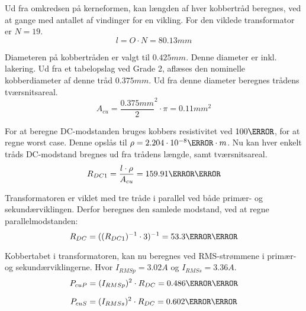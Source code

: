 Ud fra omkredsen på kerneformen, kan længden af hver kobbertråd beregnes, ved at gange med antallet af vindinger for en vikling. For den viklede transformator er $N=19$.
\begin{equation} \label{Lengde}
l = O \cdot N = 80.13mm
\end{equation}

Diameteren på kobbertråden er valgt til $0.425mm$. Denne diameter er inkl. lakering. Ud fra et tabelopslag ved Grade 2\cite{wire-diameter}, aflæses den nominelle kobberdiameter af denne tråd $0.375mm$.
Ud fra denne diameter beregnes trådens tværsnitsareal.
\begin{equation} \label{kobber-areal}
A_{cu} = \frac{0.375mm}{2}^2 \cdot \pi = 0.11mm^2
\end{equation}

For at beregne DC-modstanden bruges kobbers resistivitet ved $100\degreeCelsius$, for at regne worst case. Denne opslås til $\rho=2.204\cdot 10^{-8}\ohm \cdot m$. Nu kan hver enkelt tråds DC-modstand bregnes ud fra trådens længde, samt tværsnitsareal.
\begin{equation} \label{dc1-modstand}
R_{DC1} = \frac{l \cdot \rho}{A_{cu}} = 159.91\milli\ohm
\end{equation}

Transformatoren er viklet med tre tråde i parallel ved både primær- og sekundærviklingen. Derfor beregnes den samlede modstand, ved at regne parallelmodstanden:
\begin{equation} \label{dc-modstand}
R_{DC} = ((R_{DC1})^{-1} \cdot 3)^{-1} = 53.3\milli\ohm
\end{equation}

Kobbertabet i transformatoren, kan nu beregnes ved RMS-strømmene i primær- og sekundærviklingerne. Hvor $I_{RMSp} = 3.02A$ og $I_{RMSs} = 3.36A$.
\begin{equation} \label{dc-tab-pri}
P_{cuP} = (I_{RMSp})^2 \cdot R_{DC} = 0.486\milli\watt
\end{equation}

\begin{equation} \label{dc-tab-sek}
P_{cuS} = (I_{RMSs})^2 \cdot R_{DC} = 0.602\milli\watt
\end{equation}


